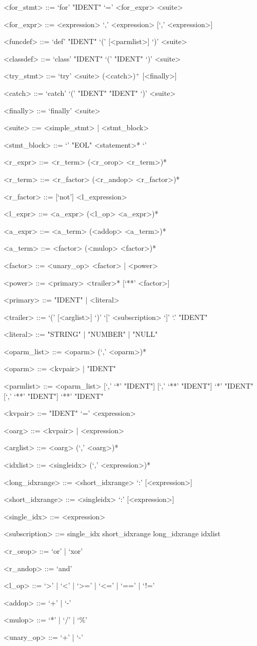 \documentclass[10pt,a4paper]{article}
\begin{document}
\begin{grammar}
<for_stmt> ::= `for' "IDENT" `=' <for_expr> <suite>

<for_expr> ::= <expression> `,' <expression> [`,' <expression>]

<funcdef> ::= `def' "IDENT" `(' [<parmlist>] `)' <suite>

<classdef> ::= `class' "IDENT" `(' "IDENT" `)' <suite>

<try_stmt> ::= `try' <suite> (<catch>)$^{+}$ [<finally>]

<catch> ::= `catch' `(' "IDENT" "IDENT" `)' <suite>

<finally> ::= `finally' <suite>

<suite> ::= <simple_stmt> | <stmt_block>

<stmt_block> ::= `{' "EOL" <statement>* `}'


<r_expr> ::= <r_term> (<r_orop> <r_term>)*

<r_term> ::= <r_factor> (<r_andop> <r_factor>)*

<r_factor> ::= [`not'] <l_expression>

<l_expr> ::= <a_expr> (<l_op> <a_expr>)*

<a_expr> ::= <a_term> (<addop> <a_term>)*

<a_term> ::= <factor> (<mulop> <factor>)*

<factor> ::= <unary_op> <factor> | <power>

<power> ::= <primary> <trailer>* [`**' <factor>]

<primary> ::= "IDENT" | <literal>

<trailer> ::= `(' [<arglist>] `)' 
	\alt `[' <subscription> `]'
	\alt `.' "IDENT"

<literal> ::= "STRING" | "NUMBER" | "NULL"


<oparm_list> ::= <oparm> (`,' <oparm>)*

<oparm> ::= <kvpair> | "IDENT"

<parmlist> ::= <oparm_list> [`,' `*' "IDENT"] [`,' `**' "IDENT"]
    \alt `*' "IDENT" [`,' `**' "IDENT"]
    \alt `**' "IDENT"

<kvpair> ::= "IDENT" `=' <expression>

<oarg> ::= <kvpair> | <expression>

<arglist> ::= <oarg> (`,' <oarg>)*

<idxlist> ::= <singleidx> (`,' <expression>)*

<long_idxrange> ::= <short_idxrange> `:' [<expression>]

<short_idxrange> ::= <singleidx> `:' [<expression>] 

<single_idx> ::= <expression>

<subscription> ::= single_idx 
	\alt short_idxrange 
	\alt long_idxrange 
	\alt idxlist

<r_orop> ::= `or' | `xor'

<r_andop> ::= `and'

<l_op> ::= `>' | `<' | `>=' | `<=' | `==' | `!='

<addop> ::= `+' | `-'

<mulop> ::= `*' | `/' | `\%'

<unary_op> ::= `+' | `-'

\end{grammar}
\end{document}
